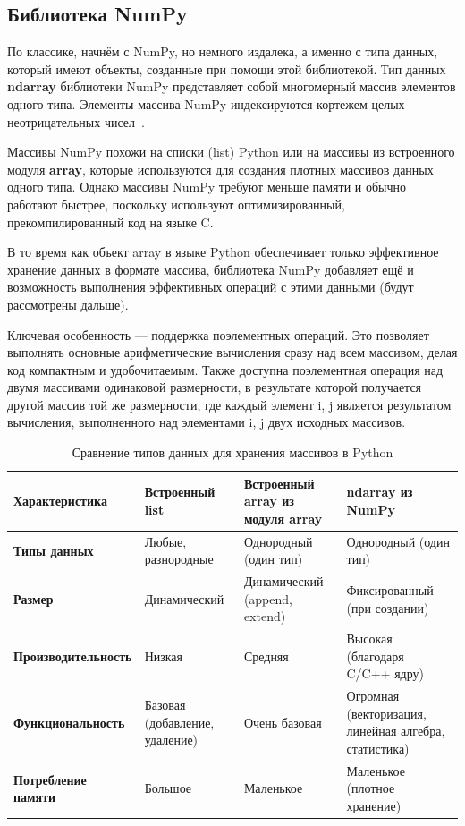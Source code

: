 \documentclass[pract]{SCWorks}
\begin{document}
\subsection{Библиотека NumPy}

По классике, начнём с NumPy, но немного издалека, а именно с типа данных, который имеют объекты, 
созданные при помощи этой библиотекой. Тип данных \textbf{ndarray} библиотеки NumPy представляет собой
многомерный массив элементов одного типа. Элементы массива NumPy индексируются кортежем целых 
неотрицательных чисел~\cite{numpy-docs,vanderplas}. 

Массивы NumPy похожи на списки (list) Python или на массивы из встроенного модуля \textbf{array}, которые 
используются для создания плотных массивов данных одного типа. Однако массивы NumPy требуют меньше 
памяти и обычно работают быстрее, поскольку используют оптимизированный, прекомпилированный код на 
языке C.

В то время как объект array в языке Python обеспечивает только эффективное хранение данных в формате 
массива, библиотека NumPy добавляет ещё и возможность выполнения эффективных операций с этими данными 
(будут рассмотрены дальше). 

Ключевая особенность — поддержка поэлементных операций. Это позволяет выполнять основные арифметические 
вычисления сразу над всем массивом, делая код компактным и удобочитаемым.
Также доступна поэлементная операция над двумя массивами одинаковой размерности, в результате 
которой получается другой массив той же размерности, где каждый элемент i, j является результатом вычисления, 
выполненного над элементами i, j двух исходных массивов.

\begin{table}[ht]
\centering
\caption{Сравнение типов данных для хранения массивов в Python}
\begin{tabular}{|p{4.7cm}|p{3.3cm}|p{3.3cm}|p{3.5cm}|}
\hline
\textbf{Характеристика} & \textbf{Встроенный list} & \textbf{Встроенный array из модуля array} & \textbf{ndarray из NumPy} \\ \hline
\textbf{Типы данных} & Любые, разнородные & Однородный (один тип) & Однородный (один тип) \\ \hline
\textbf{Размер} & Динамический & Динамический (append, extend) & Фиксированный (при создании) \\ \hline
\textbf{Производительность} & Низкая & Средняя & Высокая (благодаря C/C++ ядру) \\ \hline
\textbf{Функциональность} & Базовая (добавление, удаление) & Очень базовая & Огромная (векторизация, линейная алгебра, статистика) \\ \hline
\textbf{Потребление памяти} & Большое & Маленькое & Маленькое (плотное хранение) \\ \hline
\end{tabular}
\label{tab:comparison}
\end{table}
\end{document}
